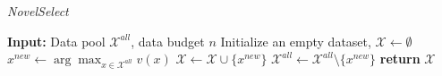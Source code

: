 \begin{algorithm}[ht!]
\caption{\textit{NovelSelect}}
\label{alg:novelselect}
\begin{algorithmic}[1]
\State \textbf{Input:} Data pool $\mathcal{X}^{all}$, data budget $n$
\State Initialize an empty dataset, $\mathcal{X} \gets \emptyset$
    \State $x^{new} \gets \arg\max_{x \in \mathcal{X}^{all}} v(x)$
    \State $\mathcal{X} \gets \mathcal{X} \cup \{x^{new}\}$
    \State $\mathcal{X}^{all} \gets \mathcal{X}^{all} \setminus \{x^{new}\}$
\EndWhile
\State \textbf{return} $\mathcal{X}$
\end{algorithmic}
\end{algorithm}
